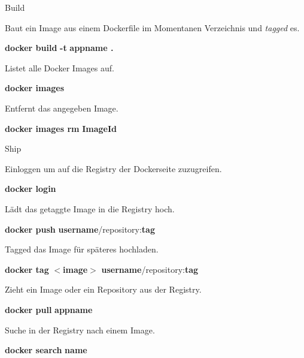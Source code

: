 \documentclass[final]{beamer}
\newlength{\specialcolwid}
\begin{document}
\begin{frame}
\begin{columns}[t]
\begin{column}{\specialcolwid}
\begin{block}{Build}

\par Baut ein Image aus einem Dockerfile im Momentanen Verzeichnis und \textit{tagged} es.

\par \textbf{docker build} \textcolor{docker-pu}{\textbf{-t}} \textcolor{docker-lb}{\textbf{appname .}}

\vspace{1cm}
\par Listet alle Docker Images auf.
\par \textbf{docker images}

\vspace{1cm}
\par Entfernt das angegeben Image.
\par \textbf{docker images rm} \textcolor{docker-lb}{\textbf{ImageId}}

\end{block}

\begin{block}{Ship}

\par Einloggen um auf die Registry der Dockerseite zuzugreifen.
\par \textbf{docker login}

\vspace{1cm}
\par Lädt das getaggte Image in die Registry hoch.
\par \textbf{docker push} \textcolor{docker-lb}{\textbf{username}}/repository:\textcolor{docker-lb}{\textbf{tag}}

\vspace{1cm}
\par Tagged das Image für späteres hochladen.
\par \textbf{docker tag } $<$\textcolor{docker-lb}{\textbf{image}}$>$ \textcolor{docker-lb}{\textbf{username}}/repository:\textcolor{docker-lb}{\textbf{tag}}

\vspace{1cm}
\par Zieht ein Image oder ein Repository aus der Registry.
\par \textbf{docker pull} \textcolor{docker-lb}{\textbf{appname}}

\vspace{1cm}
\par Suche in der Registry nach einem Image.
\par \textbf{docker search} \textcolor{docker-lb}{\textbf{name}}



\end{block}
\end{column}
\end{columns}
\end{frame}
\end{document}
